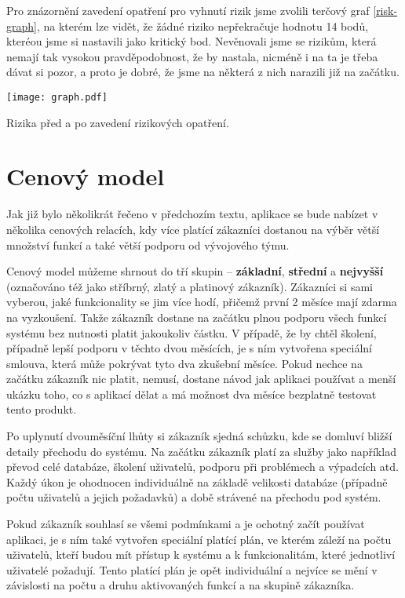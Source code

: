 \par Pro znázornění zavedení opatření pro vyhnutí rizik jsme zvolili terčový graf \ref{risk-graph}, na kterém lze vidět, že žádné riziko nepřekračuje hodnotu 14 bodů, kteréou jsme si nastavili jako kritický bod. Nevěnovali jsme se rizikům, která nemají tak vysokou pravděpodobnost, že by nastala, nicméně i na ta je třeba dávat si pozor, a proto je dobré, že jsme na některá z nich narazili již na začátku.

\begin{graph}[ht]
\centering
\texttt{[image: graph.pdf]}
\caption{Rizika před a po zavedení rizikových opatření.}
\label{risk-graph}
\end{graph}

\section{Cenový model}
\par Jak již bylo několikrát řečeno v předchozím textu, aplikace se bude nabízet v několika cenových relacích, kdy více platící zákazníci dostanou na výběr větší množství funkcí a také větší podporu od vývojového týmu.

\par Cenový model můžeme shrnout do tří skupin -- \textbf{základní}, \textbf{střední} a \textbf{nejvyšší} (označováno též jako stříbrný, zlatý a platinový zákazník). Zákazníci si sami vyberou, jaké funkcionality se jim více hodí, přičemž první 2 měsíce mají zdarma na vyzkoušení. Takže zákazník dostane na začátku plnou podporu všech funkcí systému bez nutnosti platit jakoukoliv částku. V případě, že by chtěl školení, případně lepší podporu v těchto dvou měsících, je s ním vytvořena speciální smlouva, která může pokrývat tyto dva zkušební měsíce. Pokud nechce na začátku zákazník nic platit, nemusí, dostane návod jak aplikaci používat a menší ukázku toho, co s aplikací dělat a má možnost dva měsíce bezplatně testovat tento produkt.

\par Po uplynutí dvouměsíční lhůty si zákazník sjedná schůzku, kde se domluví bližší detaily přechodu do systému. Na začátku zákazník platí za služby jako například převod celé databáze, školení uživatelů, podporu při problémech a výpadcích atd. Každý úkon je ohodnocen individuálně na základě velikosti databáze (případně počtu uživatelů a jejich požadavků) a době strávené na přechodu pod systém.

\par Pokud zákazník souhlasí se všemi podmínkami a je ochotný začít používat aplikaci, je s ním také vytvořen speciální platící plán, ve kterém záleží na počtu uživatelů, kteří budou mít přístup k systému a k funkcionalitám, které jednotliví uživatelé požadují. Tento platící plán je opět individuální a nejvíce se mění v závislosti na počtu a druhu aktivovaných funkcí a na skupině zákazníka.

